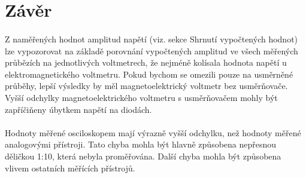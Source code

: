 \documentclass{praktikum}
\begin{document}
\section{Závěr}
\paragraph{}
Z naměřených hodnot amplitud napětí (viz. sekce Shrnutí vypočtených hodnot) lze vypozorovat na základě porovnání vypočtených amplitud ve všech měřených průbězích na jednotlivých voltmetrech, že nejméně kolísala hodnota napětí u elektromagnetického voltmetru. Pokud bychom se omezili pouze na usměrněné průběhy, lepší výsledky by měl magnetoelektrický voltmetr bez usměrňovače. Vyšší odchylky magnetoelektrického voltmetru s usměrňovačem mohly být zapříčiňeny úbytkem napětí na diodách. 

\paragraph{}
Hodnoty měřené osciloskopem mají výrazně vyšší odchylku, než hodnoty měřené analogovými přístroji. Tato chyba mohla být hlavně způsobena nepřesnou děličkou 1:10, která nebyla proměřována. Další chyba mohla být způsobena vlivem ostatních měřících přístrojů.
\end{document}
